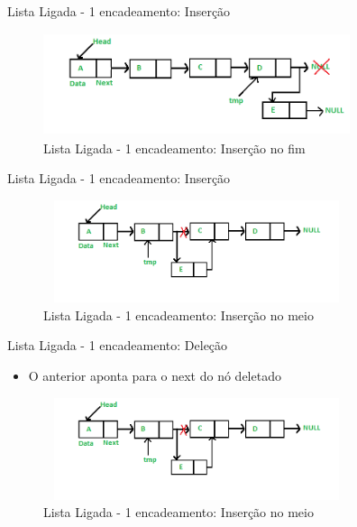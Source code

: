 \begin{frame}
	\begin{block}{Lista Ligada - 1 encadeamento: Inserção}
		\begin{figure}[!htb]
			\centering	  				
			\includegraphics[height=3cm, width = 9cm]{./pic/Linkedlist_insert_last.png}
			\caption{Lista Ligada - 1 encadeamento: Inserção no fim \cite{GEEKS_2018}}
			\label{fig_LLS_three}
		\end{figure}
	\end{block}
\end{frame}

\begin{frame}
	\begin{block}{Lista Ligada - 1 encadeamento: Inserção}
		\begin{figure}[!htb]
			\centering	  				
			\includegraphics[height=3cm, width = 9cm]{./pic/Linkedlist_insert_middle.png}
			\caption{Lista Ligada - 1 encadeamento: Inserção no meio \cite{GEEKS_2018}}
			\label{fig_LLS_four}
		\end{figure}
	\end{block}
\end{frame}


\begin{frame}

	\begin{block}{Lista Ligada - 1 encadeamento: Deleção}
		\begin{itemize}
			\item O anterior aponta para o next do nó deletado
		\end{itemize}
		\begin{figure}[!htb]
			\centering	  				
			\includegraphics[height=3cm, width = 9cm]{./pic/Linkedlist_insert_middle.png}
			\caption{Lista Ligada - 1 encadeamento: Inserção no meio \cite{GEEKS_2018}}
			\label{fig_LLS_five}
		\end{figure}
	\end{block}
\end{frame}


